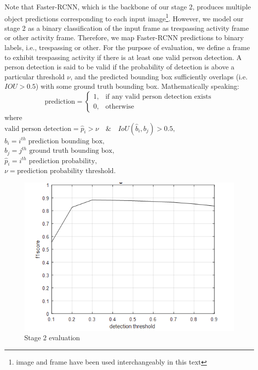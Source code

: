 Note that Faster-RCNN, which is the backbone of our stage 2, produces multiple object predictions corresponding to each input image\footnote{image and frame have been used interchangeably in this text}. However, we model our stage 2 as a binary classification of the input frame as trespassing activity frame or other activity frame. Therefore, we map Faster-RCNN predictions to binary labels, i.e., trespassing or other. For the purpose of evaluation, we define a frame to exhibit trespassing activity if there is at least one valid person detection. A person detection is said to be valid if the probability of detection is above a particular threshold $\nu$, and the predicted bounding box sufficiently overlaps (i.e. $IOU >0.5$) with some ground truth bounding box. Mathematically speaking:
$$
\text{prediction} = 
\begin{cases}
1, &    \text{if any valid person detection exists} \\
0, &    \text{otherwise}
\end{cases}
$$
where \\
$\text{valid person detection} = \hat{p}_i>\nu \quad \& \quad IoU(\hat{b}_i,b_j)>0.5,$ \\
$\hat{b}_i =i^{th} \text{ prediction bounding box,}$ \\
$b_j =j^{th} \text{ ground truth bounding box,}$ \\
$\hat{p}_i = i^{th} \text{ prediction probability,}$ \\
$\nu =  \text{prediction probability threshold.}$

\begin{figure}
    \centering
    \includegraphics[width=\linewidth]{images/f1-analysis-s2.png}
    \caption{Stage 2 evaluation}
    \label{fig:f1-analysis-s2}
\end{figure}



